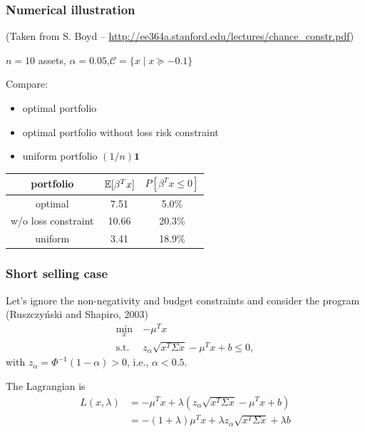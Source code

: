\documentclass[aspectratio=169]{beamer}
\begin{document}
\begin{frame}
\frametitle{Numerical illustration}

(Taken from S. Boyd -- \url{http://ee364a.stanford.edu/lectures/chance_constr.pdf})

$n = 10$ assets, $\alpha = 0.05$,$\mathcal{C} = \{x \mid x \succeq -0.1\}$

\smallskip

Compare:
\begin{itemize}
\item
optimal portfolio
\item
optimal portfolio without loss risk constraint
\item
uniform portfolio $(1/n)\mathbf{1}$
\end{itemize}

\begin{center}
\begin{tabular}{c|c|c}
portfolio & ${\mathbb{E}}[\beta^T x]$ & $P[\beta^T x \leq 0]$ \\
\hline
optimal & 7.51 & 5.0\% \\
w/o loss constraint & 10.66 & 20.3\% \\
uniform & 3.41 & 18.9\%
\end{tabular}
\end{center}

\end{frame}


\begin{frame}
\frametitle{Short selling case}

Let's ignore the non-negativity and budget constraints and consider the program (Ruszczyński and Shapiro, 2003)
\begin{align*}
	\min_x \ & -\mu^T x \\
	\text{s.t. } & z_{\alpha} \sqrt{x^T\Sigma x} - \mu^Tx + b \leq 0,
\end{align*}
with $z_{\alpha} = \Phi^{-1}(1-\alpha) > 0$, i.e., $\alpha < 0.5$.

The Lagrangian is
\begin{align*}
L(x, \lambda) &= -\mu^T x + \lambda \left( z_{\alpha} \sqrt{x^T\Sigma x} - \mu^Tx + b \right) \\
&= -(1+\lambda) \mu^T x + \lambda z_{\alpha} \sqrt{x^T\Sigma x} + \lambda b
\end{align*}

\end{frame}
\end{document}
